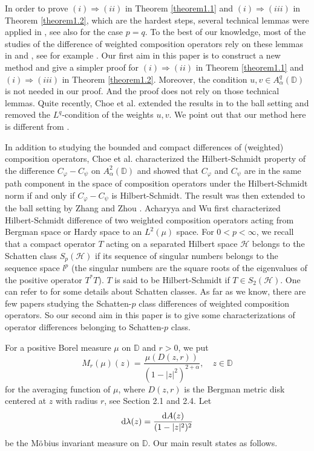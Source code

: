 \documentclass[preprint,12pt,times]{elsarticle}
\theoremstyle{definition}
\theoremstyle{remark}
\numberwithin{equation}{section}
\begin{document}
In order to prove $(i)\Rightarrow(ii)$ in Theorem \ref{theorem1.1} and $(i)\Rightarrow(iii)$ in Theorem \ref{theorem1.2}, which are the hardest steps, several technical lemmas were applied in \cite{5}, see also \cite{4} for the case $p=q$. To the best of our knowledge, most of the studies of the difference of weighted composition operators rely on these lemmas in \cite{4} and \cite{5}, see for example \cite{16, 20}. Our first aim in this paper is to construct a new method and give a simpler proof for $(i)\Rightarrow (ii)$ in Theorem \ref{theorem1.1} and $(i)\Rightarrow(iii)$ in Theorem \ref{theorem1.2}. Moreover, the condition $u,v\in A_{\alpha}^q(\mathbb{D})$ is not needed in our proof. And the proof does not rely on those technical lemmas. Quite recently, Choe et al. \cite{3} extended the results in \cite{5} to the ball setting and removed the $L^q$-condition of the weights $u,v$. We point out that our method here is different from \cite{3}.

In addition to studying the bounded and compact differences of (weighted) composition operators, Choe   et al. \cite{6} characterized the Hilbert-Schmidt property of the difference $C_{\varphi}-C_{\psi} $ on $A_{\alpha}^2(\mathbb{D})$ and showed that $C_{\varphi}$ and $C_{\psi}$ are in the same path component in the space of composition operators under the Hilbert-Schmidt norm if and only if $C_{\varphi}-C_{\psi}$ is Hilbert-Schmidt. The result was then extended to the ball setting by Zhang and Zhou \cite{27}. Acharyya and Wu \cite{1} first characterized Hilbert-Schmidt difference of two weighted composition operators acting from Bergman space or Hardy space to an $L^2(\mu)$ space. For $0<p<\infty$, we recall that a compact operator $T$ acting on a separated Hilbert space $\mathcal{H}$ belongs to the Schatten class $S_p(\mathcal{H})$ if its sequence of singular numbers belongs to the sequence space $l^p$ (the singular numbers are the square roots of the eigenvalues of the positive operator $T^{*}T$). $T$ is said to be Hilbert-Schmidt if $T\in S_2(\mathcal{H})$. One can refer to \cite[Chapter 1]{29} for some details about Schatten classes. As far as we know, there are few papers studying the Schatten-$p$ class differences of weighted composition operators. So our second aim in this paper is to give some characterizations of operator differences belonging to Schatten-$p$ class.

For a positive Borel measure $\mu$ on $\mathbb{D}$ and $r>0$, we put
\[M_r(\mu)(z)=\frac{\mu(D(z,r))}{(1-|z|^2)^{2+\alpha}},\quad z\in\mathbb{D}\]
for the averaging function of $\mu$, where $D(z,r)$ is the Bergman metric disk centered at $z$ with radius $r$, see Section 2.1 and 2.4. Let 
\[{\rm d}\lambda(z)=\frac{{\rm d}A(z)}{(1-|z|^2)^2}\]
be the M$\ddot{\rm o}$bius invariant measure on $\mathbb{D}$. Our main result states as follows.
\end{document}
